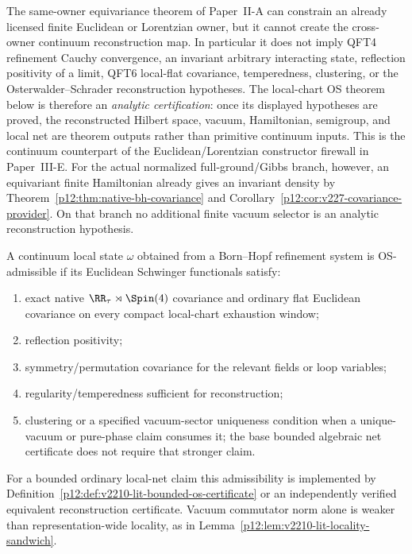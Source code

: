 \documentclass[12pt,a4paper]{article}
\begin{document}
\begin{remark}
\label{p12:rem:v248-analytic-reconstruction-firewall}
The same-owner equivariance theorem of Paper~II-A can constrain an already
licensed finite Euclidean or Lorentzian owner, but it cannot create the
cross-owner continuum reconstruction map.  In particular it does not imply
QFT4 refinement Cauchy convergence, an invariant arbitrary interacting state,
reflection positivity of a limit, QFT6 local-flat covariance, temperedness,
clustering, or the Osterwalder--Schrader reconstruction hypotheses.  The
local-chart OS theorem below is therefore an \emph{analytic certification}:
once its displayed hypotheses are proved, the reconstructed Hilbert space,
vacuum, Hamiltonian, semigroup, and local net are theorem outputs rather than
primitive continuum inputs.  This is the continuum counterpart of the
Euclidean/Lorentzian constructor firewall in Paper~III-E.
For the actual normalized full-ground/Gibbs branch, however, an equivariant
finite Hamiltonian already gives an invariant density by
Theorem~\ref{p12:thm:native-bh-covariance} and
Corollary~\ref{p12:cor:v227-covariance-provider}. On that branch no additional
finite vacuum selector is an analytic reconstruction hypothesis.
\end{remark}

\begin{definition}
\label{p12:def:os-admissible-limit}
A continuum local state \(\omega\) obtained from a Born--Hopf refinement system is OS-admissible if its Euclidean Schwinger functionals satisfy:
\begin{enumerate}[label=(\roman*), leftmargin=2em]
\item exact native \(\RR_\tau\rtimes\Spin(4)\) covariance and ordinary flat Euclidean covariance on every compact local-chart exhaustion window;
\item reflection positivity;
\item symmetry/permutation covariance for the relevant fields or loop variables;
\item regularity/temperedness sufficient for reconstruction;
\item clustering or a specified vacuum-sector uniqueness condition when a unique-vacuum or pure-phase claim consumes it; the base bounded algebraic net certificate does not require that stronger claim.
\end{enumerate}
\end{definition}
For a bounded ordinary local-net claim this admissibility is implemented by
Definition~\ref{p12:def:v2210-lit-bounded-os-certificate} or an independently
verified equivalent reconstruction certificate. Vacuum commutator norm alone
is weaker than representation-wide locality, as in
Lemma~\ref{p12:lem:v2210-lit-locality-sandwich}.
\end{document}
